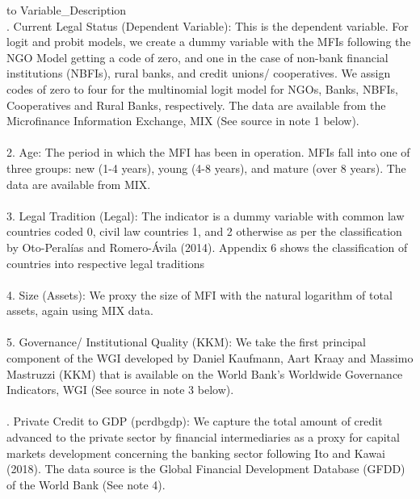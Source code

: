 \documentclass[a4paper, nobind]{templates/ociamthesis}
\begin{document}
\begin{table}

\caption{\label{tab:unnamed-chunk-13}Description of Variables}
\centering
\fontsize{9}{11}\selectfont
\begin{tabu} to 
\toprule
Variable\_Description\\
. Current Legal Status (Dependent Variable): This is the dependent variable. For logit and probit models, we create a dummy variable with the MFIs following the NGO Model getting a code of zero, and one in the case of non-bank financial institutions (NBFIs), rural banks, and credit unions/ cooperatives. We assign codes of zero to four for the multinomial logit model for NGOs, Banks, NBFIs, Cooperatives and Rural Banks, respectively. The data are available from the Microfinance Information Exchange, MIX (See source in note 1 below).\\
\\
2.  Age: The period in which the MFI has been in operation. MFIs fall into one of three groups: new (1-4 years), young (4-8 years), and mature (over 8 years). The data are available from MIX.\\
\\
3. Legal Tradition (Legal): The indicator is a dummy variable with common law countries coded 0, civil law countries 1, and 2 otherwise as per the classification by Oto-Peralías and Romero-Ávila (2014). Appendix 6 shows the classification of countries into respective legal traditions\\
\addlinespace
\\
4. Size (Assets): We proxy the size of MFI with the natural logarithm of total assets, again using MIX data.\\
\\
5. Governance/ Institutional Quality (KKM): We take the first principal component of the WGI developed by Daniel Kaufmann, Aart Kraay and Massimo Mastruzzi (KKM) that is available on the World Bank's Worldwide Governance Indicators, WGI (See source in note 3 below).\\
\\
. Private Credit to GDP (pcrdbgdp): We capture the total amount of credit advanced to the private sector by financial intermediaries as a proxy for capital markets development concerning the banking sector following Ito and Kawai (2018). The data source is the Global Financial Development Database (GFDD) of the World Bank (See note 4).\\
\\

\end{tabu}
\end{table}
\end{document}
